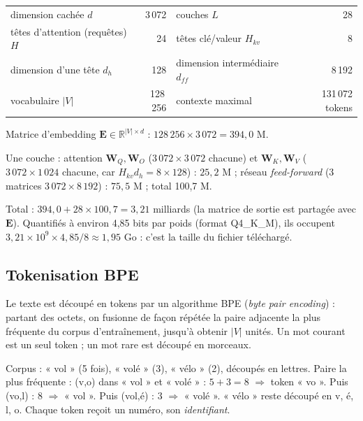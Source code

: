 \documentclass[11pt,a4paper]{article}
\newcommand{\R}{\mathbb{R}}
\newcommand{\mat}[1]{\mathbf{#1}}
\begin{document}
\begin{center}
\begin{tabular}{lr|lr}
\toprule
dimension cachée $d$ & 3\,072 & couches $L$ & 28 \\
têtes d'attention (requêtes) $H$ & 24 & têtes clé/valeur $H_{kv}$ & 8 \\
dimension d'une tête $d_h$ & 128 & dimension intermédiaire $d_{ff}$ & 8\,192 \\
vocabulaire $|V|$ & 128\,256 & contexte maximal & 131\,072 tokens \\
\bottomrule
\end{tabular}
\end{center}

\begin{exemple}
Matrice d'embedding $\mat{E}\in\R^{|V|\times d}$ : $128\,256\times3\,072 = 394{,}0$ M.

Une couche : attention $\mat{W}_Q,\mat{W}_O$ ($3\,072\times3\,072$ chacune) et $\mat{W}_K,\mat{W}_V$
($3\,072\times1\,024$ chacune, car $H_{kv}d_h = 8\times128$) : $25{,}2$ M ; réseau
\emph{feed-forward} (3 matrices $3\,072\times8\,192$) : $75{,}5$ M ; total 100,7 M.

Total : $394{,}0 + 28\times100{,}7 = 3{,}21$ milliards (la matrice de sortie est partagée avec
$\mat{E}$). Quantifiés à environ 4,85 bits par poids (format Q4\_K\_M), ils occupent
$3{,}21\times10^9\times4{,}85/8 \approx 1{,}95$ Go : c'est la taille du fichier téléchargé.
\end{exemple}

\subsection{Tokenisation BPE}
Le texte est découpé en tokens par un algorithme BPE (\emph{byte pair encoding}) : partant des
octets, on fusionne de façon répétée la paire adjacente la plus fréquente du corpus
d'entraînement, jusqu'à obtenir $|V|$ unités. Un mot courant est un seul token ; un mot rare est
découpé en morceaux.

\begin{exemple}
Corpus : « vol » (5 fois), « volé » (3), « vélo » (2), découpés en lettres.
Paire la plus fréquente : (v,o) dans « vol » et « volé » : $5+3=8$ $\Rightarrow$ token « vo ».
Puis (vo,l) : 8 $\Rightarrow$ « vol ». Puis (vol,é) : 3 $\Rightarrow$ « volé ». « vélo » reste
découpé en v, é, l, o. Chaque token reçoit un numéro, son \emph{identifiant}.
\end{exemple}
\end{document}
